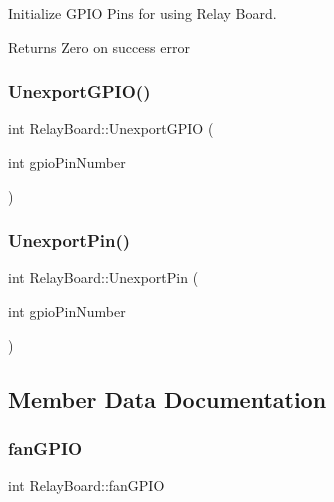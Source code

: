 Initialize G\+P\+IO Pins for using Relay Board.

\begin{DoxyReturn}{Returns}
Zero on success error 
\end{DoxyReturn}
\mbox{\label{classRelayBoard_a501dbfa2878a57538eff31b16e70d74d}} 
\subsubsection{\texorpdfstring{Unexport\+G\+P\+I\+O()}{UnexportGPIO()}}
{\footnotesize\ttfamily int Relay\+Board\+::\+Unexport\+G\+P\+IO (\begin{DoxyParamCaption}\item[{int}]{gpio\+Pin\+Number }\end{DoxyParamCaption})}

\mbox{\label{classRelayBoard_aa63dcc275551dd06476c03d68a059228}} 
\subsubsection{\texorpdfstring{Unexport\+Pin()}{UnexportPin()}}
{\footnotesize\ttfamily int Relay\+Board\+::\+Unexport\+Pin (\begin{DoxyParamCaption}\item[{int}]{gpio\+Pin\+Number }\end{DoxyParamCaption})\hspace{0.3cm}{\ttfamily [private]}}



\subsection{Member Data Documentation}
\mbox{\label{classRelayBoard_a70ab1391ffac8f4c01c64ba1a811b6fc}} 
\subsubsection{\texorpdfstring{fan\+G\+P\+IO}{fanGPIO}}
{\footnotesize\ttfamily int Relay\+Board\+::fan\+G\+P\+IO\hspace{0.3cm}{\ttfamily [private]}}

